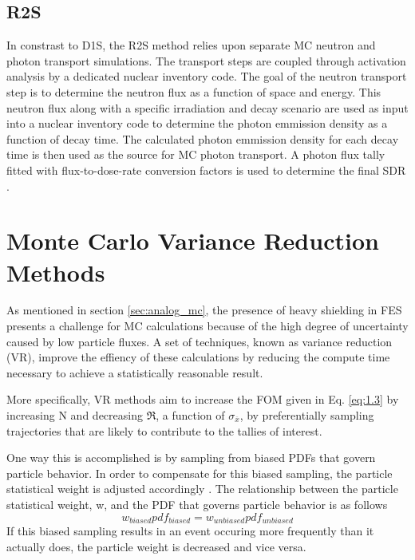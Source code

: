 \subsection{R2S}
In constrast to D1S, the R2S method relies upon separate MC neutron and photon
transport simulations.  The transport steps are coupled through activation analysis 
by a dedicated nuclear inventory code.
The goal of the neutron transport step is to determine the neutron flux
as a function of space and energy.  This neutron flux along with a specific irradiation
and decay scenario are used as input into a nuclear inventory
code to determine the photon emmission density as a function of decay time.
The calculated photon emmission density for each decay time
is then used as the source for MC photon transport.  A photon flux tally
fitted with flux-to-dose-rate conversion factors is used to
determine the final SDR \cite{r2s}.


\section{Monte Carlo Variance Reduction Methods}\label{sec:vr_methods}

As mentioned in section \ref{sec:analog_mc}, the presence of heavy shielding in
FES presents a challenge for MC calculations because of the high degree of 
uncertainty caused by low particle fluxes. A set of techniques, known as 
variance reduction (VR),
improve the effiency of these calculations by reducing the compute time 
necessary to achieve a statistically reasonable result.

More specifically, VR methods aim to increase the FOM given in Eq. \ref{eq:1.3} 
by increasing N and decreasing $\Re$, a function of $\sigma_{\overline{x}}$,
by preferentially sampling trajectories that are likely to
contribute to the tallies of interest.

One way this is accomplished is by sampling from biased PDFs that govern particle behavior. 
In order to compensate for this biased sampling, the particle statistical weight
is adjusted accordingly \cite{cadis}.
The relationship between the particle statistical weight, w, and the PDF that
governs particle behavior is as follows
\begin{equation} \label{eq:2.1}
		w_{biased} pdf_{biased} = w_{unbiased} pdf_{unbiased}
\end{equation}
If this biased sampling results in an event occuring more frequently than it actually does,
the particle weight is decreased and vice versa.

